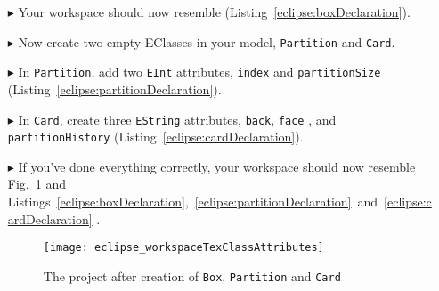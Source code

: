 \begin{itemize}

\item[$\blacktriangleright$] Your workspace should now resemble (Listing~\ref{eclipse:boxDeclaration}).

\newpage 

\vspace{0.5cm}

 

\FloatBarrier

\vspace{0.5cm}

\item[$\blacktriangleright$] Now create two empty EClasses in your model, \texttt{Partition} and \texttt{Card}.

\vspace{0.5cm}

\item[$\blacktriangleright$] In \texttt{Partition}, add two \texttt{EInt} attributes, \texttt{index} and \texttt{partitionSize} (Listing~\ref{eclipse:partitionDeclaration}).

 

\vspace{0.5cm}

\item[$\blacktriangleright$] In \texttt{Card}, create three \texttt{EString} attributes, \texttt{back}, \texttt{face} , and \texttt{part\-it\-ion\-His\-tory} (Listing~\ref{eclipse:cardDeclaration}).



\item[$\blacktriangleright$] If you've done everything correctly, your workspace should now resemble Fig.~\ref{eclipse:workspaceClassAttributes} and Listings~\ref{eclipse:boxDeclaration},~\ref{eclipse:partitionDeclaration}~and~\ref{eclipse:cardDeclaration} .

\begin{figure}[htbp]
	\centering
  \texttt{[image: eclipse\_workspaceTexClassAttributes]}
	\caption{The project after creation of \texttt{Box}, \texttt{Partition} and \texttt{Card}}
	\label{eclipse:workspaceClassAttributes}
\end{figure} 


\end{itemize}
